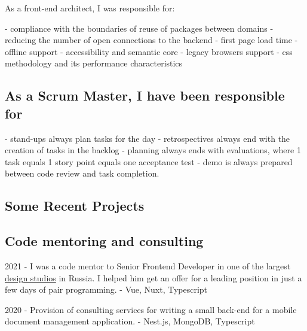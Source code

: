 \documentclass{yb}
\begin{document}
\begin{samepage}
As a front-end architect, I was responsible for:

 - compliance with the boundaries of reuse of packages between domains
\newline - reducing the number of open connections to the backend
\newline - first page load time
\newline - offline support
\newline - accessibility and semantic core
\newline - legacy browsers support
\newline - css methodology and its performance characteristics

\end{samepage}

\subsection*{As a Scrum Master, I have been responsible for}

 - stand-ups always plan tasks for the day
\newline - retrospectives always end with the creation of tasks in the backlog
\newline - planning always ends with evaluations, where 1 task equals 1 story point equals one acceptance test
\newline - demo is always prepared between code review and task completion.

\begin{samepage}

\subsection*{Some Recent Projects}

\subsection*{Code mentoring and consulting}

2021 - I was a code mentor to Senior Frontend Developer in one of the largest \href{https://pinkman.ru/}{design studios} in Russia. I helped him get an offer for a leading position in just a few days of pair programming.
\newline - Vue, Nuxt, Typescript

2020 - Provision of consulting services for writing a small back-end for a mobile document management application.
\newline - Nest.js, MongoDB, Typescript

\end{samepage}
\end{document}
